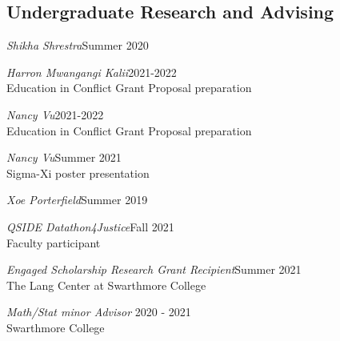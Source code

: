 \documentclass[margin,line]{res}
\newenvironment{list1}{
  \begin{list}{\ding{113}}{%
      \setlength{\itemsep}{0in}
      \setlength{\parsep}{0in} \setlength{\parskip}{0in}
      \setlength{\topsep}{0in} \setlength{\partopsep}{0in} 
      \setlength{\leftmargin}{0.17in}}}{\end{list}}
\begin{document}
\begin{resume}
\subsection{Undergraduate Research and Advising} 
\begin{list1}
\item[] {\em Shikha Shrestra}\hfill Summer 2020\\
\vspace*{2mm}
\item[] {\em Harron Mwangangi Kalii}\hfill 2021-2022\\
Education in Conflict Grant Proposal preparation 
\vspace*{2mm}
\item[] {\em Nancy Vu}\hfill 2021-2022\\
Education in Conflict Grant Proposal preparation 
\vspace*{2mm}
\item[] {\em Nancy Vu}\hfill Summer 2021\\
Sigma-Xi poster presentation 
\vspace*{2mm}
\item[] {\em Xoe Porterfield}\hfill Summer 2019\\
\vspace*{2mm}
\item[] {\em QSIDE Datathon4Justice}\hfill Fall 2021\\
Faculty participant 
\vspace*{2mm}
\item[] {\em Engaged Scholarship Research Grant Recipient}\hfill Summer 2021\\
The Lang Center at Swarthmore College 
\vspace*{2mm}
\item[] {\em Math/Stat minor Advisor} \hfill  2020 - 2021\\
Swarthmore College
\end{list1}

\vspace*{-0.7cm}

\end{resume}
\end{document}
